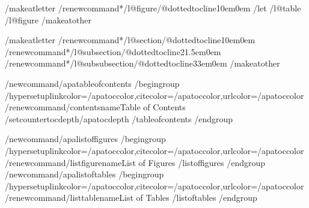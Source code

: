 %
/makeatletter
/renewcommand*/l@figure{/@dottedtocline{1}{0em}{0em}}
/let /l@table /l@figure
/makeatother

/makeatletter
/renewcommand*/l@section{/@dottedtocline{1}{0em}{0em}}
/renewcommand*/l@subsection{/@dottedtocline{2}{1.5em}{0em}}
/renewcommand*/l@subsubsection{/@dottedtocline{3}{3em}{0em}}
/makeatother

/newcommand{/apatableofcontents}{%
  /begingroup
  /hypersetup{linkcolor=/apatoccolor,citecolor=/apatoccolor,urlcolor=/apatoccolor}%
  /renewcommand{/contentsname}{Table of Contents}%
  /setcounter{tocdepth}{/apatocdepth}%
  /tableofcontents
  /endgroup}

/newcommand{/apalistoffigures}{%
  /begingroup
  /hypersetup{linkcolor=/apatoccolor,citecolor=/apatoccolor,urlcolor=/apatoccolor}%
  /renewcommand{/listfigurename}{List of Figures}%
  /listoffigures
  /endgroup}
/newcommand{/apalistoftables}{%
  /begingroup
  /hypersetup{linkcolor=/apatoccolor,citecolor=/apatoccolor,urlcolor=/apatoccolor}%
  /renewcommand{/listtablename}{List of Tables}%
  /listoftables
  /endgroup}

